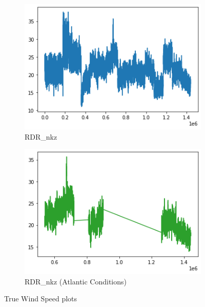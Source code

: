 \begin{figure}[h]
     \centering
     \begin{subfigure}[t]{0.49\textwidth}
         \centering
         \includegraphics[width=\textwidth]{figures/distributions/RDR-TWS.png}
         \caption{RDR\_nkz}
     \end{subfigure}
     \hfill
     \begin{subfigure}[t]{0.49\textwidth}
         \centering
         \includegraphics[width=\textwidth]{figures/distributions/RDR-atlantic-TWS.png}
         \caption{RDR\_nkz (Atlantic Conditions)}
     \end{subfigure}
        \caption{True Wind Speed plots}
\end{figure}

\clearpage
